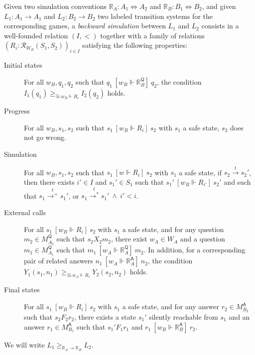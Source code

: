 \documentclass[sigplan,10pt,review,anonymous]{acmart}
\newcommand{\kw}[1]{\ensuremath{ \mathsf{#1} }}
\newcommand{\ifr}[1]{\ [{#1}]\ }
\begin{document}
\begin{definition}
Given
two simulation conventions
$\mathbb{R}_A : A_1 \Leftrightarrow A_2$ and
$\mathbb{R}_B : B_1 \Leftrightarrow B_2$,
and given
$L_1 : A_1 \rightarrow A_1$ and
$L_2 : B_2 \rightarrow B_2$
two labeled transition systems for the corresponding games,
a \emph{backward simulation} between $L_1$ and $L_2$
consists in a
well-founded relation $(I, <)$
together with a family of relations
$(R_i : \mathcal{R}_{W_B}(S_1, S_2))_{i \in I}$
satisfying the following properties:
\begin{description}
\item[Initial states]
  For all $w_B, q_1, q_2$ such that
  $q_1 \ifr{w_B \Vdash \mathbb{R}_B^\kw{Q}} q_2$,
  the condition $I_1(q_1) \ge_{\exists i . w_B \Vdash R_i} I_2(q_2)$ holds.
\item[Progress]
  For all $w_B, s_1, s_2$ such that $s_1 \ifr{w_B \Vdash R_i} s_2$
  with $s_1$ a safe state,
  $s_2$ does not go wrong.
\item[Simulation]
  For all $w_B, s_1, s_2$ such that $s_1 \ifr{w \Vdash R_i} s_2$
  with $s_1$ a safe state, if $s_2 \stackrel{t}{\rightarrow} s_2'$,
  then there exists $i' \in I$ and $s_1' \in S_1$
  such that $s_1' \ifr{w_B \Vdash R_{i'}} s_2'$ and
  such that 
    $s_1 \stackrel{t}{\rightarrow^+} s_1'$, or
    $s_1 \stackrel{t}{\rightarrow^*} s_1' \:\wedge\: i' < i$.
\item[External calls]
  For all $s_1 \ifr{w_B \Vdash R_i} s_2$
  with $s_1$ a safe state, and
  for any question $m_2 \in M_{A_2}^\kw{Q}$
  such that $s_2 \mathrel{X_2} m_2$,
  there exist $w_A \in W_A$ and a question $m_1 \in M_{A_1}^\kw{Q}$
  such that $m_1 \ifr{w_A \Vdash \mathbb{R}_A^\kw{Q}} m_2$.
  In addition, for a corresponding pair of related answers
  $n_1 \ifr{w_A \Vdash \mathbb{R}_A^\kw{A}} n_2$,
  the condition $Y_1(s_1, n_1) \ge_{\exists i . w_A \Vdash R_i} Y_2(s_2, n_2)$ holds.
\item[Final states]
  For all $s_1 \ifr{w_B \Vdash R_i} s_2$
  with $s_1$ a safe state, and
  for any answer $r_2 \in M_{B_2}^\kw{A}$
  such that $s_2 \mathrel{F_2} r_2$,
  there exists a state $s_1'$ silently reachable from $s_1$ and
  an answer $r_1 \in M_{B_1}^\kw{A}$ such that
  $s_1' \mathrel{F_1} r_1$ and $r_1 \ifr{w_B \Vdash \mathbb{R}_B^\kw{A}} r_2$.
\end{description}
We will write $L_1 \ge_{\mathbb{R}_A \rightarrow \mathbb{R}_B} L_2$.
\end{definition}

\end{document}
